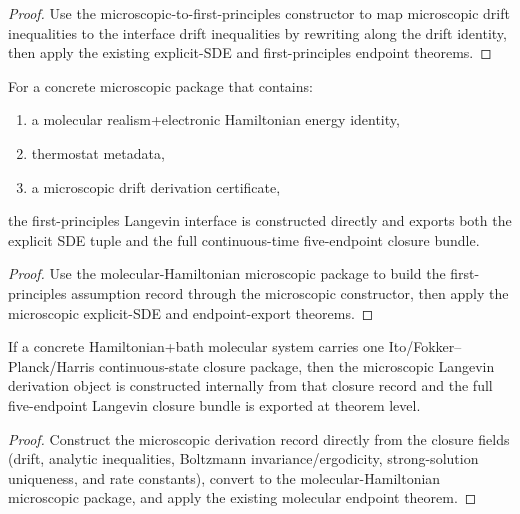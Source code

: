 \begin{proof}
Use the microscopic-to-first-principles constructor to map microscopic drift inequalities to the interface drift inequalities by rewriting along the drift identity, then apply the existing explicit-SDE and first-principles endpoint theorems.
\end{proof}

\begin{theorem}\label{thm:langevin-molecular-hamiltonian-thermostat-constructor}
For a concrete microscopic package that contains:
\begin{enumerate}
\item a molecular realism+electronic Hamiltonian energy identity,
\item thermostat metadata,
\item a microscopic drift derivation certificate,
\end{enumerate}
the first-principles Langevin interface is constructed directly and exports both the explicit SDE tuple and the full continuous-time five-endpoint closure bundle.
\end{theorem}

\begin{proof}
Use the molecular-Hamiltonian microscopic package to build the first-principles assumption record through the microscopic constructor, then apply the microscopic explicit-SDE and endpoint-export theorems.
\end{proof}

\begin{theorem}\label{thm:langevin-concrete-hamiltonian-bath-end-to-end}
If a concrete Hamiltonian+bath molecular system carries one Ito/Fokker--Planck/Harris continuous-state closure package, then the microscopic Langevin derivation object is constructed internally from that closure record and the full five-endpoint Langevin closure bundle is exported at theorem level.
\end{theorem}

\begin{proof}
Construct the microscopic derivation record directly from the closure fields (drift, analytic inequalities, Boltzmann invariance/ergodicity, strong-solution uniqueness, and rate constants), convert to the molecular-Hamiltonian microscopic package, and apply the existing molecular endpoint theorem.
\end{proof}

